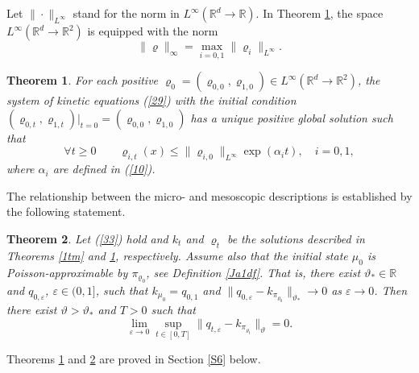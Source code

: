 \documentclass[reqno,11pt]{amsart}
\newtheorem{theorem}{Theorem}[section]
\theoremstyle{definition}
\theoremstyle{remark}
\numberwithin{equation}{section}
\begin{document}
Let $\|\cdot \|_{L^\infty}$ stand for the norm in $L^\infty
(\mathds{R}^d \to \mathds{R})$. In Theorem \ref{Ktm}, the space
$L^\infty (\mathds{R}^d \to \mathds{R}^2)$ is equipped with the norm
\begin{equation}
  \label{l-norm}
\| \varrho \|_{\infty} = \max_{i=0,1}\|\varrho_{i}\|_{L^\infty}.
\end{equation}
\begin{theorem}
  \label{Ktm}
For each positive $\varrho_0=(\varrho_{0,0}, \varrho_{1,0})\in
L^\infty (\mathds{R}^d \to \mathds{R}^2)$, the system of kinetic
equations (\ref{29}) with the initial condition $(\varrho_{0,t},
\varrho_{1,t})|_{t=0}=(\varrho_{0,0}, \varrho_{1,0})$  has a unique
positive global solution such that
\begin{equation}
  \label{40a}
\forall t \geq 0 \qquad  \varrho_{i,t} (x) \leq
\|\varrho_{i,0}\|_{L^\infty} \exp (\alpha_i t ), \quad i=0,1,
\end{equation}
where $\alpha_i$ are defined in (\ref{10}).
\end{theorem}
The relationship between the micro- and mesoscopic descriptions is
established by the following statement.
\begin{theorem}
  \label{4tm}
Let (\ref{33}) hold and $k_t$ and $\varrho_t$ be the solutions
described in Theorems \ref{1tm} and \ref{Ktm}, respectively. Assume
also that the initial state $\mu_0$ is Poisson-approximable by
$\pi_{\varrho_0}$, see Definition \ref{Ja1df}. That is, there exist
$\vartheta_*\in \mathds{R}$ and $q_{0, \varepsilon}$, $\varepsilon
\in (0,1]$, such that $k_{\mu_0} = q_{0,1}$ and $\|q_{0,\varepsilon}
- k_{\pi_{\varrho_0}}\|_{\vartheta_*} \to 0$ as $\varepsilon \to 0$.
Then there exist $\vartheta > \vartheta_*$ and $T>0$ such that
\begin{equation}
  \label{39}
 \lim_{\varepsilon \to 0} \sup_{t\in [0,T]} \|q_{t,\varepsilon} -
k_{\pi_{\varrho_t}}\|_{\vartheta} =0.
\end{equation}
\end{theorem}
Theorems \ref{Ktm} and \ref{4tm} are proved in Section \ref{S6}
below.
\end{document}
